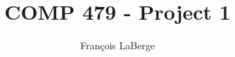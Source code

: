 \documentclass[]{report}
\title{COMP 479 - Project 1}
\author{François LaBerge}
\begin{document}
\maketitle

\begin{abstract}
\end{abstract}
\end{document}
